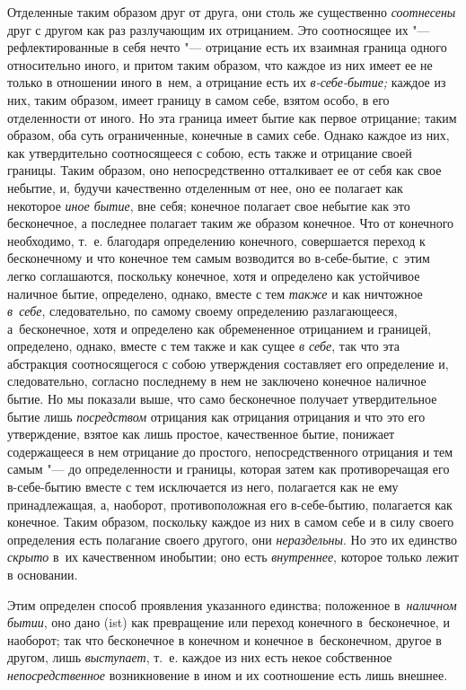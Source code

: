 Отделенные таким образом друг от друга, они столь же существенно
{\em соотнесены} друг с другом как раз разлучающим их отрицанием. Это
соотносящее их "--- рефлектированные в себя нечто "--- отрицание есть их
взаимная граница одного относительно иного, и притом таким образом, что каждое
из них имеет ее не только в отношении иного в~нем, а отрицание есть их
{\em в-себе-бытие;} каждое из них, таким образом, имеет границу в самом себе,
взятом особо, в его отделенности от иного. Но эта граница имеет бытие как
первое отрицание; таким образом, оба суть ограниченные, конечные в самих себе.
Однако каждое из них, как утвердительно соотносящееся с собою, есть также и
отрицание своей границы. Таким образом, оно непосредственно отталкивает ее от
себя как свое небытие, и, будучи качественно отделенным от нее, оно ее полагает
как некоторое {\em иное бытие}, вне себя; конечное полагает свое небытие как
это бесконечное, а последнее полагает таким же образом конечное. Что от
конечного необходимо, т.~е. благодаря определению конечного, совершается
переход к бесконечному и что конечное тем самым возводится во в-себе-бытие,
с~этим легко соглашаются, поскольку конечное, хотя и определено как устойчивое
наличное бытие, определено, однако, вместе с тем {\em также} и как ничтожное
{\em в~себе}, следовательно, по самому своему определению разлагающееся,
а~бесконечное, хотя и определено как обремененное отрицанием и границей,
определено, однако, вместе с тем также и как сущее {\em в себе}, так что эта
абстракция соотносящегося с собою утверждения составляет его определение и,
следовательно, согласно последнему в нем не заключено конечное наличное бытие.
Но мы показали выше, что само бесконечное получает утвердительное бытие лишь
{\em посредством} отрицания как отрицания отрицания и что это его утверждение,
взятое как лишь простое, качественное бытие, понижает содержащееся в нем
отрицание до простого, непосредственного отрицания и тем самым "--- до
определенности и границы, которая затем как противоречащая его в-себе-бытию
вместе с тем исключается из него, полагается как не ему принадлежащая, а,
наоборот, противоположная его в-себе-бытию, полагается как конечное. Таким
образом, поскольку каждое из них в самом себе и в силу своего определения есть
полагание своего другого, они {\em нераздельны}. Но это их единство
{\em скрыто} в~их качественном инобытии; оно есть {\em внутреннее}, которое
только лежит в основании.

Этим определен способ проявления указанного единства; положенное
в~{\em наличном бытии}, оно дано (ist) как превращение или переход конечного
в~бесконечное, и наоборот; так что бесконечное в конечном и конечное
в~бесконечном, другое в другом, лишь {\em выступает}, т.~е. каждое из них есть
некое собственное {\em непосредственное} возникновение в ином и их соотношение
есть лишь внешнее.

